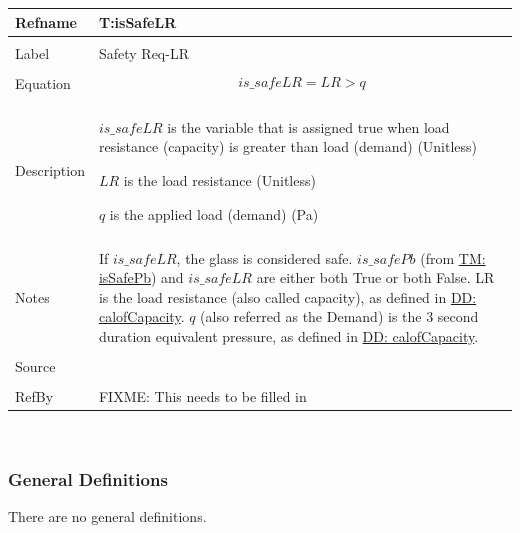 \documentclass[12pt]{article}
\begin{document}
\noindent \begin{minipage}{\textwidth}
\begin{tabular}{p{} p{}}
\toprule \textbf{Refname} & \textbf{T:isSafeLR}
\label{T:isSafeLR}
\\ \midrule \\
Label & Safety Req-LR
\\ \midrule \\
Equation & \begin{dmath}
           is\_safeLR=LR>q
           \end{dmath}
\\ \midrule \\
Description & \begin{symbDescription}
              \item{$is\_safeLR$ is the variable that is assigned true when load resistance (capacity) is greater than load (demand) (Unitless)}
              \item{$LR$ is the load resistance (Unitless)}
              \item{$q$ is the applied load (demand) (Pa)}
              \end{symbDescription}
\\ \midrule \\
Notes & If $is\_safeLR$, the glass is considered safe. $is\_safePb$ (from \hyperref[T:isSafePb]{TM: isSafePb}) and $is\_safeLR$ are either both True or both False. LR is the load resistance (also called capacity), as defined in \hyperref[DD:calofCapacity]{DD: calofCapacity}. $q$ (also referred as the Demand) is the 3 second duration equivalent pressure, as defined in \hyperref[DD:calofCapacity]{DD: calofCapacity}.
\\ \midrule \\
Source & \cite{astm2009}
\\ \midrule \\
RefBy & FIXME: This needs to be filled in
\\ \bottomrule \end{tabular}
\end{minipage}\\
\subsubsection{General Definitions}
\label{Sec:GDs}
There are no general definitions.
\end{document}
